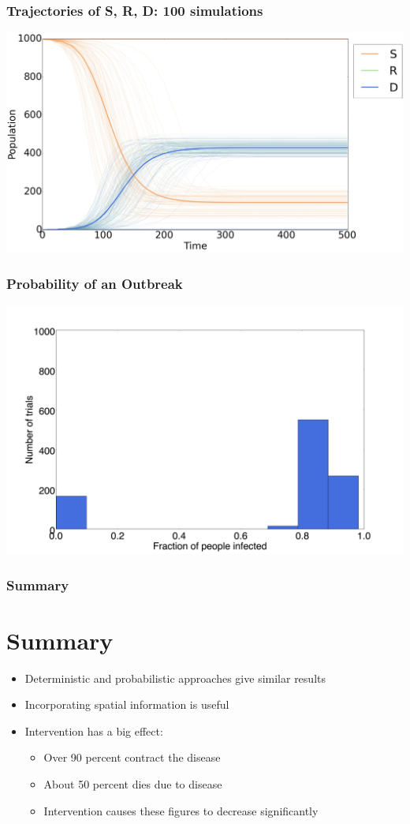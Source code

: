 \documentclass[30pt]{beamer}
\begin{document}
\begin{frame}
\frametitle{Trajectories of S, R, D: 100 simulations}
\includegraphics[width=\textwidth]{average-time-series}
\end{frame}

\begin{frame}
\frametitle{Probability of an Outbreak}
\includegraphics[width=\textwidth]{Histogram-sabd}
\end{frame}


\begin{frame}
\frametitle{Summary}
\section{Summary}
\begin{itemize}
\item Deterministic and probabilistic approaches give similar results
\item Incorporating spatial information is useful
\item Intervention has a big effect:
\begin{itemize}
\item Over 90 percent contract the disease
\item About 50 percent dies due to disease
\item Intervention causes these figures to decrease significantly 
\end{itemize}
\end{itemize}
\end{frame}
\end{document}

